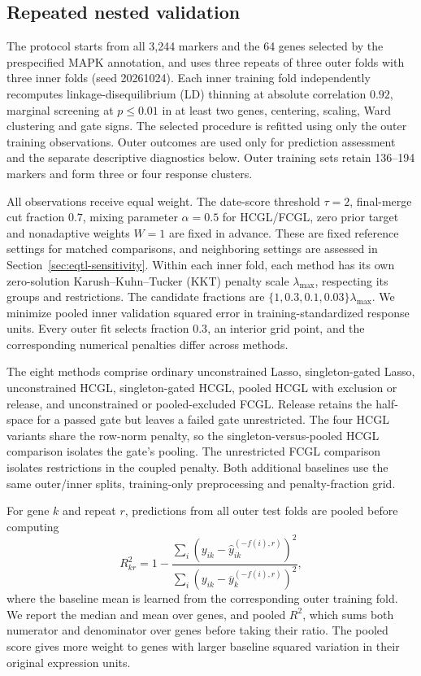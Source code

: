 \documentclass[lineno,pdflatex,sn-basic]{sn-jnl}
\theoremstyle{thmstyleone}
\begin{document}
\subsection{Repeated nested validation}\label{sec:eqtl-nested}

The protocol starts from all 3,244 markers and the 64 genes
selected by the prespecified MAPK annotation, and uses three repeats of
three outer folds with three inner folds (seed 20261024). Each inner
training fold independently recomputes linkage-disequilibrium (LD) thinning at absolute correlation
$0.92$, marginal screening at $p\leq0.01$ in at least two genes, centering,
scaling, Ward clustering and gate signs. The selected procedure is refitted
using only the outer training observations. Outer outcomes are used only
for prediction assessment and the separate descriptive diagnostics below.
Outer training sets retain 136--194 markers and form three or four response
clusters.

All observations receive equal weight. The date-score threshold $\tau=2$,
final-merge cut fraction $0.7$, mixing parameter $\alpha=0.5$ for HCGL/FCGL,
zero prior target and nonadaptive weights $W=1$ are fixed in advance.
These are fixed reference settings for matched comparisons, and neighboring
settings are assessed in Section~\ref{sec:eqtl-sensitivity}.
Within each inner fold, each method has its own zero-solution Karush--Kuhn--Tucker (KKT) penalty
scale $\lambda_{\max}$, respecting its groups and restrictions.
The candidate fractions are $\{1,0.3,0.1,0.03\}\lambda_{\max}$.
We minimize pooled inner validation squared error in training-standardized
response units. Every outer fit selects fraction $0.3$, an interior grid
point, and the corresponding numerical penalties differ across methods.

The eight methods comprise ordinary unconstrained Lasso, singleton-gated Lasso,
unconstrained HCGL, singleton-gated HCGL, pooled HCGL with exclusion or release,
and unconstrained or pooled-excluded FCGL. Release retains the half-space for a
passed gate but leaves a failed gate unrestricted. The four HCGL variants share
the row-norm penalty, so the singleton-versus-pooled HCGL comparison isolates
the gate's pooling. The unrestricted FCGL comparison isolates restrictions in
the coupled penalty. Both additional baselines use the same outer/inner splits,
training-only preprocessing and penalty-fraction grid.

For gene $k$ and repeat $r$, predictions from all outer test folds are pooled
before computing
\[
 R^2_{kr}=1-\frac{\sum_i(y_{ik}-\widehat y^{(-f(i),r)}_{ik})^2}
 {\sum_i(y_{ik}-\overline y^{(-f(i),r)}_k)^2},
\]
where the baseline mean is learned from the corresponding outer training
fold. We report the median and mean over genes, and pooled $R^2$, which
sums both numerator and denominator over genes before taking their ratio.
The pooled score gives more weight to genes with larger baseline squared
variation in their original expression units.
\end{document}
